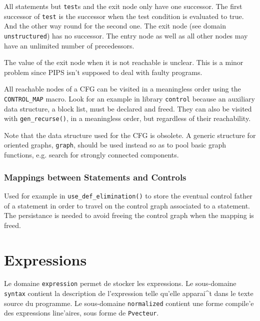 {All statements but \verb/test/s and the exit node only have one
successor. The first successor of \verb/test/ is the successor when the
test condition is evaluated to true.  And the other way round for the
second one. The exit node (see domain \verb/unstructured/) has no
successor. The entry node as well as all other nodes may have an
unlimited number of precedessors.

The value of the exit node when it is not reachable is unclear. This is
a minor problem since PIPS isn't supposed to deal with faulty programs.

All reachable nodes of a CFG can be visited in a meaningless order using the
\verb/CONTROL_MAP/ macro. Look for an example in library \verb/control/
because an auxiliary data structure, a block list, must be declared and
freed. They can also be visited with \verb/gen_recurse()/, in a
meaningless order, but regardless of their reachability.

Note that the data structure used for the CFG is obsolete. A generic
structure for oriented graphs, \verb/graph/, should be used instead so
as to pool basic graph functions, e.g. search for strongly connected
components.

\subsubsection{Mappings between Statements and Controls}

{}

{}

Used for example in \verb/use_def_elimination()/ to store the eventual
control father of a statement in order to travel on the control graph
associated to a statement. The persistance is needed to avoid freeing
the control graph when the mapping is freed.

\section{Expressions}
\label{expression}

{}

Le domaine \verb/expression/ permet de stocker les expressions.  Le
sous-domaine {\tt syntax} contient la description de l'expression telle
qu'elle apparai^t dans le texte source du programme. Le sous-domaine
{\tt normalized} contient une forme compile'e des expressions
line'aires, sous forme de \verb/Pvecteur/.

}
